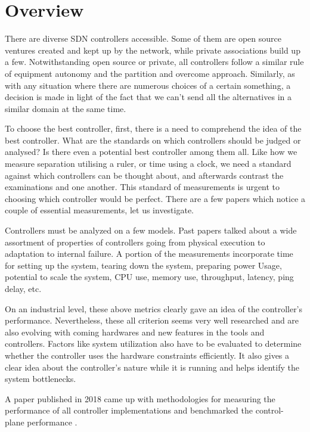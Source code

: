 \chapter{Overview}

    There are diverse SDN controllers accessible. Some of them are open source ventures created and kept up by the network, while private associations build up a few. Notwithstanding open source or private, all controllers follow a similar rule of equipment autonomy and the partition and overcome approach. Similarly, as with any situation where there are numerous choices of a certain something, a decision is made in light of the fact that we can't send all the alternatives in a similar domain at the same time.
 
    To choose the best controller, first, there is a need to comprehend the idea of the best controller. What are the standards on which controllers should be judged or analysed? Is there even a potential best controller among them all. Like how we measure separation utilising a ruler, or time using a clock, we need a standard against which controllers can be thought about, and afterwards contrast the examinations and one another. This standard of measurements is urgent to choosing which controller would be perfect. There are a few papers which notice a couple of essential measurements, let us investigate.
    
   Controllers must be analyzed on a few models. Past papers talked about a wide assortment of properties of controllers going from physical execution to adaptation to internal failure. A portion of the measurements incorporate time for setting up the system, tearing down the system, preparing power Usage, potential to scale the system, CPU use, memory use, throughput, latency, ping delay, etc.
    
     On an industrial level, these above metrics clearly gave an idea of the controller's performance. Nevertheless, these all criterion seems very well researched and are also evolving with coming hardwares and new features in the tools and controllers. Factors like system utilization also have to be evaluated to determine whether the controller uses the hardware constraints efficiently. It also gives a clear idea about the controller's nature while it is running and helps identify the system bottlenecks.
    
    A paper published in 2018 came up with methodologies for measuring the performance of all controller implementations and benchmarked the control- plane performance \cite{rfc8456}.
    
